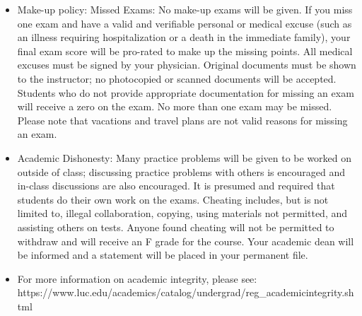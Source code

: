 \documentclass{article}\usepackage[]{graphicx}\usepackage[]{color}
\begin{document}
\begin{itemize}
\item Make-up policy: Missed Exams:  No make-up exams will be given. If you miss one exam and have a valid and verifiable personal or medical excuse (such as an illness requiring hospitalization or a death in the immediate family), your final exam score will be pro-rated to make up the missing points. All medical excuses must be signed by your physician. Original documents must be shown to the instructor; no photocopied or scanned documents will be accepted. Students who do not provide appropriate documentation for missing an exam will receive a zero on the exam. No more than one exam may be missed. Please note that vacations and travel plans are not valid reasons for missing an exam.

\item Academic Dishonesty: Many practice problems will be given to be worked on outside of class; discussing practice problems with others is encouraged and in-class discussions are also encouraged. It is presumed and required that students do their own work on the exams. Cheating includes, but is not limited to, illegal collaboration, copying, using materials not permitted, and assisting others on tests. Anyone found cheating will not be permitted to withdraw and will receive an F grade for the course. Your academic dean will be informed and a statement will be placed in your permanent file.\\

\item For more information on academic integrity, please see: \\
https://www.luc.edu/academics/catalog/undergrad/reg\_academicintegrity.shtml
\end{itemize}
\end{document}
